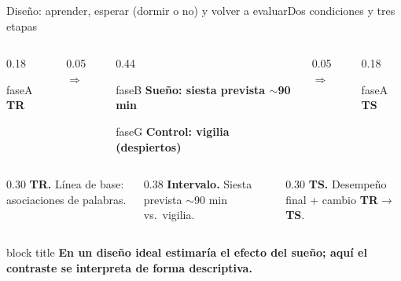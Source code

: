 \documentclass[aspectratio=169,11pt,t]{beamer}
\newcommand{\claim}[1]{%
  \begin{beamercolorbox}[wd=\textwidth,sep=7pt,rounded=true,shadow=false]{block title}%
    \centering\bfseries #1%
  \end{beamercolorbox}}
\newcommand{\fase}[2]{%
  \begin{beamercolorbox}[wd=\linewidth,sep=6pt,center,rounded=true]{#1}%
    \bfseries #2%
  \end{beamercolorbox}}
\begin{document}
\begin{frame}{Diseño: aprender, esperar (dormir o no) y volver a evaluar}{Dos condiciones y tres etapas}
  \vskip1pt
  \begin{columns}[c,onlytextwidth]
    \begin{column}{0.18\textwidth}\fase{faseA}{TR}\end{column}
    \begin{column}{0.05\textwidth}\centering$\Longrightarrow$\end{column}
    \begin{column}{0.44\textwidth}
      \fase{faseB}{Sueño: siesta prevista $\sim$90 min}
      \vskip3pt
      \fase{faseG}{Control: vigilia (despiertos)}
    \end{column}
    \begin{column}{0.05\textwidth}\centering$\Longrightarrow$\end{column}
    \begin{column}{0.18\textwidth}\fase{faseA}{TS}\end{column}
  \end{columns}
  \vskip7pt
  \begin{columns}[T,onlytextwidth]
    \begin{column}{0.30\textwidth}
      {\scriptsize\textbf{TR.} Línea de base: asociaciones de palabras.}
    \end{column}
    \begin{column}{0.38\textwidth}
      {\scriptsize\textbf{Intervalo.} Siesta prevista $\sim$90 min vs.\ vigilia.}
    \end{column}
    \begin{column}{0.30\textwidth}
      {\scriptsize\textbf{TS.} Desempeño final + cambio \textbf{TR$\to$TS}.}
    \end{column}
  \end{columns}
  \vskip8pt
  \claim{En un diseño ideal estimaría el efecto del sueño; aquí el contraste se interpreta de forma descriptiva.}
\end{frame}
\end{document}
